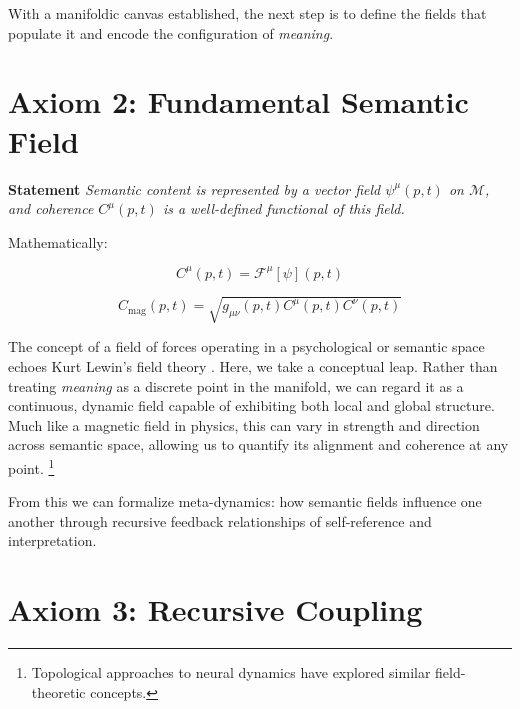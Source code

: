 With a manifoldic canvas established, the next step is to define the fields that populate it and encode the configuration of \textit{meaning}.


\section{Axiom 2: Fundamental Semantic Field}
\label{1.2:axiom_2_fundamental_semantic_field}

\textbf{Statement} \textit{Semantic content is represented by a vector field \(\psi^\mu(p,t)\) on \(\mathcal{M}\), and coherence \(C^\mu(p,t)\) is a well-defined functional of this field.}

Mathematically:

\begin{equation}
C^\mu(p,t) = \mathcal{F}^\mu[\psi](p,t)
\end{equation}

\begin{equation}
C_{\text{mag}}(p,t) = \sqrt{g_{\mu\nu}(p,t) C^\mu(p,t) C^\nu(p,t)}
\end{equation}

The concept of a field of forces operating in a psychological or semantic space echoes Kurt Lewin's field theory \autocite{Lewin1951}. Here, we take a conceptual leap. Rather than treating \textit{meaning} as a discrete point in the manifold, we can regard it as a continuous, dynamic field capable of exhibiting both local and global structure. Much like a magnetic field in physics, this can vary in strength and direction across semantic space, allowing us to quantify its alignment and coherence at any point. \footnote{Topological approaches to neural dynamics \autocite{Bassett2018, Petri2014} have explored similar field-theoretic concepts.}

From this we can formalize meta-dynamics: how semantic fields influence one another through recursive feedback relationships of self-reference and interpretation.


\section{Axiom 3: Recursive Coupling}
\label{1.3:axiom_3_recursive_coupling}

